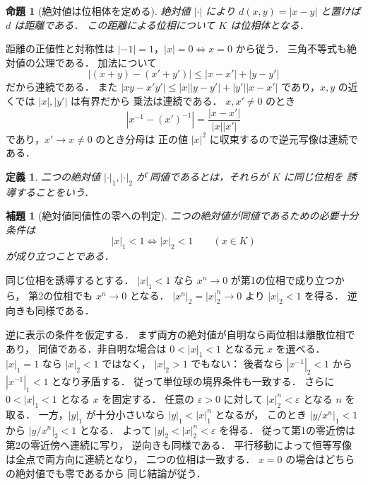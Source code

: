 \documentclass[a5paper,10pt,onecolumn]{jsarticle}
\makeatletter
\theoremstyle{mathnotetheorem}
\newtheorem{definition}[theorem]{定義}
\newtheorem{lemma}[theorem]{補題}
\newtheorem{proposition}[theorem]{命題}
\renewcommand{\proofname}{証明}
\renewenvironment{proof}[1][\proofname]{%
  \par\pushQED{\qed}\normalfont\topsep4\p@\@plus2\p@\relax
  \trivlist\item[\hskip\labelsep\bfseries #1]\ignorespaces
}{\popQED\endtrivlist\@endpefalse}
\makeatother
\begin{document}
\begin{proposition}[絶対値は位相体を定める]\label{prop:abs-topology}
絶対値 $|\cdot|$ により
$d(x,y)=|x-y|$ と置けば $d$ は距離である．
この距離による位相について $K$ は位相体となる．
\end{proposition}
\begin{proof}
距離の正値性と対称性は
$|-1|=1$，$|x|=0\iff x=0$ から従う．
三角不等式も絶対値の公理である．
加法について
\[
 |(x+y)-(x'+y')|
 \le|x-x'|+|y-y'|
\]
だから連続である．
また
$|xy-x'y'|\le|x||y-y'|+|y'||x-x'|$
であり，$x,y$ の近くでは $|x|,|y'|$ は有界だから
乗法は連続である．
$x,x'\ne0$ のとき
\[
 |x^{-1}-(x')^{-1}|
 =\frac{|x-x'|}{|x||x'|}
\]
であり，$x'\to x\ne0$ のとき分母は
正の値 $|x|^2$ に収束するので逆元写像は連続である．
\end{proof}

\begin{definition}
二つの絶対値 $|\cdot|_1,|\cdot|_2$ が
\emph{同値}であるとは，それらが $K$ に同じ位相を
誘導することをいう．
\end{definition}

\begin{lemma}[絶対値同値性の零への判定]\label{lem:equiv-zero}
二つの絶対値が同値であるための必要十分条件は
\[
 |x|_1<1\iff|x|_2<1
 \qquad(x\in K)
\]
が成り立つことである．
\end{lemma}
\begin{proof}
同じ位相を誘導するとする．
$|x|_1<1$ なら $x^n\to0$ が第1の位相で成り立つから，
第2の位相でも $x^n\to0$ となる．
$|x^n|_2=|x|_2^n\to0$ より $|x|_2<1$ を得る．
逆向きも同様である．

逆に表示の条件を仮定する．
まず両方の絶対値が自明なら両位相は離散位相であり，
同値である．非自明な場合は
$0<|x|_1<1$ となる元 $x$ を選べる．
$|x|_1=1$ なら $|x|_2<1$ ではなく，
$|x|_2>1$ でもない：
後者なら $|x^{-1}|_2<1$ から
$|x^{-1}|_1<1$ となり矛盾する．
従って単位球の境界条件も一致する．
さらに $0<|x|_1<1$ となる $x$ を固定する．
任意の $\varepsilon>0$ に対して
$|x|_2^n<\varepsilon$ となる $n$ を取る．
一方，$|y|_1$ が十分小さいなら
$|y|_1<|x|_1^n$ となるが，
このとき $|y/x^n|_1<1$ から
$|y/x^n|_2<1$ となる．
よって $|y|_2<|x|_2^n<\varepsilon$ を得る．
従って第1の零近傍は第2の零近傍へ連続に写り，
逆向きも同様である．
平行移動によって恒等写像は全点で両方向に連続となり，
二つの位相は一致する．
$x=0$ の場合はどちらの絶対値でも零であるから
同じ結論が従う．
\end{proof}
\end{document}
